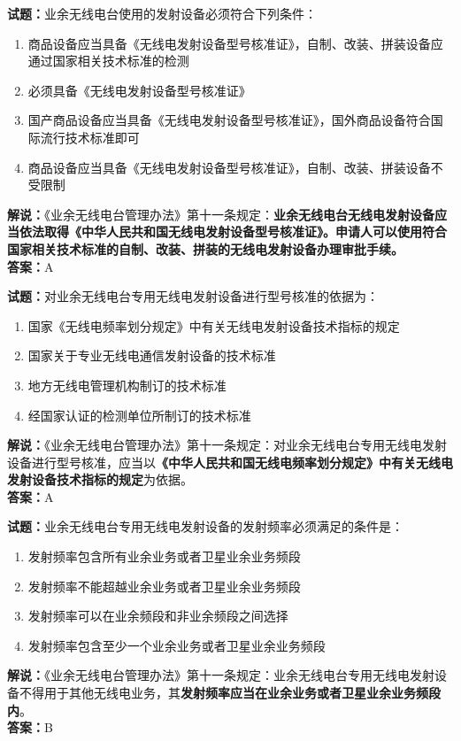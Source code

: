 \documentclass{ctexbook}
\begin{document}
\bigskip


\noindent\textbf{试题：}业余无线电台使用的发射设备必须符合下列条件：
\begin{enumerate}[leftmargin=3em]
\item 商品设备应当具备《无线电发射设备型号核准证》，自制、改装、拼装设备应通过国家相关技术标准的检测
\item 必须具备《无线电发射设备型号核准证》
\item 国产商品设备应当具备《无线电发射设备型号核准证》，国外商品设备符合国际流行技术标准即可
\item 商品设备应当具备《无线电发射设备型号核准证》，自制、改装、拼装设备不受限制
\end{enumerate}
\noindent\textbf{解说：}《业余无线电台管理办法》第十一条规定：\textbf{业余无线电台无线电发射设备应当依法取得《中华人民共和国无线电发射设备型号核准证》。申请人可以使用符合国家相关技术标准的自制、改装、拼装的无线电发射设备办理审批手续。}\\\noindent\textbf{答案：}A




\bigskip


\noindent\textbf{试题：}对业余无线电台专用无线电发射设备进行型号核准的依据为：
\begin{enumerate}[leftmargin=3em]
\item 国家《无线电频率划分规定》中有关无线电发射设备技术指标的规定
\item 国家关于专业无线电通信发射设备的技术标准
\item 地方无线电管理机构制订的技术标准
\item 经国家认证的检测单位所制订的技术标准
\end{enumerate}
\noindent\textbf{解说：}《业余无线电台管理办法》第十一条规定：对业余无线电台专用无线电发射设备进行型号核准，应当以\textbf{《中华人民共和国无线电频率划分规定》中有关无线电发射设备技术指标的规定}为依据。\\\noindent\textbf{答案：}A




\bigskip


\noindent\textbf{试题：}业余无线电台专用无线电发射设备的发射频率必须满足的条件是：
\begin{enumerate}[leftmargin=3em]
\item 发射频率包含所有业余业务或者卫星业余业务频段
\item 发射频率不能超越业余业务或者卫星业余业务频段
\item 发射频率可以在业余频段和非业余频段之间选择
\item 发射频率包含至少一个业余业务或者卫星业余业务频段
\end{enumerate}
\noindent\textbf{解说：}《业余无线电台管理办法》第十一条规定：业余无线电台专用无线电发射设备不得用于其他无线电业务，其\textbf{发射频率应当在业余业务或者卫星业余业务频段内}。\\\noindent\textbf{答案：}B
\end{document}

